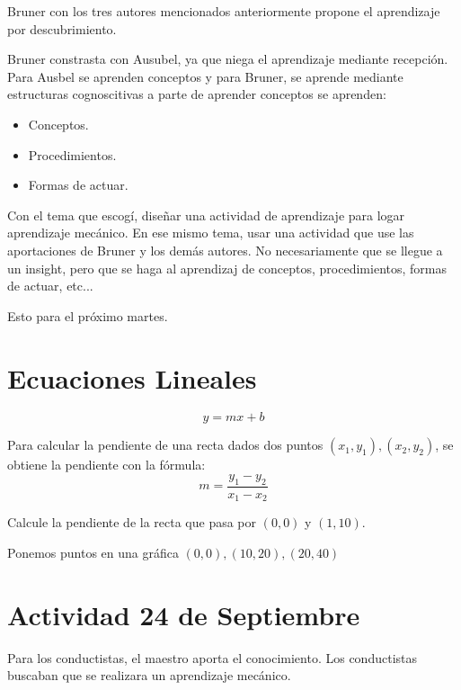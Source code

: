 \documentclass[12pt]{report}
\newcounter{it}
\theoremstyle{largebreak}
\begin{document}
    Bruner con los tres autores mencionados anteriormente propone el aprendizaje por descubrimiento.

    Bruner constrasta con Ausubel, ya que niega el aprendizaje mediante recepción. Para Ausbel se aprenden conceptos y para Bruner, se aprende mediante estructuras cognoscitivas a parte de aprender conceptos se aprenden:
    \begin{itemize}
        \item Conceptos.
        \item Procedimientos.
        \item Formas de actuar.
    \end{itemize}

    \begin{excer}
        Con el tema que escogí, diseñar una actividad de aprendizaje para logar aprendizaje mecánico. En ese mismo tema, usar una actividad que use las aportaciones de Bruner y los demás autores. No necesariamente que se llegue a un insight, pero que se haga al aprendizaj de conceptos, procedimientos, formas de actuar, etc...

        Esto para el próximo martes.
    \end{excer}

    \section{Ecuaciones Lineales}

    \begin{equation*}
        y=mx+b
    \end{equation*}

    Para calcular la pendiente de una recta dados dos puntos $(x_1,y_1),(x_2,y_2)$, se obtiene la pendiente con la fórmula:
    \begin{equation*}
        m=\frac{y_1-y_2}{x_1-x_2}
    \end{equation*}
    \begin{excer}
        Calcule la pendiente de la recta que pasa por $(0,0)$ y $(1,10)$.
    \end{excer}

    Ponemos puntos en una gráfica $(0,0),(10, 20),(20,40)$

    \section{Actividad 24 de Septiembre}

    Para los conductistas, el maestro aporta el conocimiento. Los conductistas buscaban que se realizara un aprendizaje mecánico.
\end{document}
